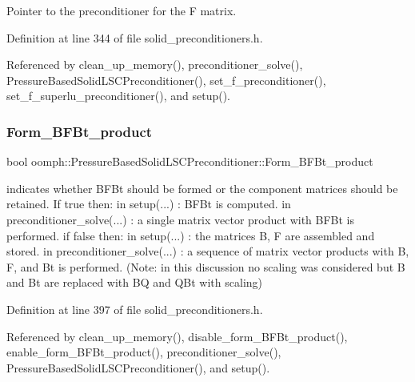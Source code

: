 Pointer to the \textquotesingle{}preconditioner\textquotesingle{} for the F matrix. 



Definition at line 344 of file solid\+\_\+preconditioners.\+h.



Referenced by clean\+\_\+up\+\_\+memory(), preconditioner\+\_\+solve(), Pressure\+Based\+Solid\+L\+S\+C\+Preconditioner(), set\+\_\+f\+\_\+preconditioner(), set\+\_\+f\+\_\+superlu\+\_\+preconditioner(), and setup().

\mbox{\label{classoomph_1_1PressureBasedSolidLSCPreconditioner_a216ed50190c2fa031c222b309e573f09}} 
\subsubsection{\texorpdfstring{Form\+\_\+\+B\+F\+Bt\+\_\+product}{Form\_BFBt\_product}}
{\footnotesize\ttfamily bool oomph\+::\+Pressure\+Based\+Solid\+L\+S\+C\+Preconditioner\+::\+Form\+\_\+\+B\+F\+Bt\+\_\+product\hspace{0.3cm}{\ttfamily [private]}}



indicates whether B\+F\+Bt should be formed or the component matrices should be retained. If true then\+: in setup(...) \+: B\+F\+Bt is computed. in preconditioner\+\_\+solve(...) \+: a single matrix vector product with B\+F\+Bt is performed. if false then\+: in setup(...) \+: the matrices B, F are assembled and stored. in preconditioner\+\_\+solve(...) \+: a sequence of matrix vector products with B, F, and Bt is performed. (Note\+: in this discussion no scaling was considered but B and Bt are replaced with BQ and Q\+Bt with scaling) 



Definition at line 397 of file solid\+\_\+preconditioners.\+h.



Referenced by clean\+\_\+up\+\_\+memory(), disable\+\_\+form\+\_\+\+B\+F\+Bt\+\_\+product(), enable\+\_\+form\+\_\+\+B\+F\+Bt\+\_\+product(), preconditioner\+\_\+solve(), Pressure\+Based\+Solid\+L\+S\+C\+Preconditioner(), and setup().

